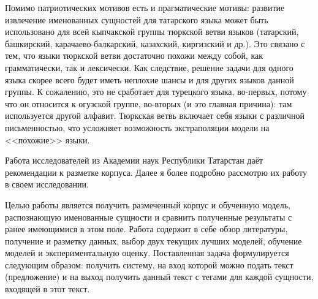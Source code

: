 Помимо патриотических мотивов есть и прагматические мотивы: развитие извлечение именованных сущностей для татарского языка может быть использовано для всей кыпчакской группы тюркской ветви языков (татарский, башкирский, карачаево-балкарский, казахский, киргизский и др.). Это связано с тем, что языки тюркской ветви достаточно похожи между собой, как грамматически, так и лексически. Как следствие, решение задачи для одного языка скорее всего будет иметь неплохие шансы и для других языков данной группы. К сожалению, это не сработает для турецкого языка, во-первых, потому что он относится к огузской группе, во-вторых (и это главная причина): там используется другой алфавит. Тюркская ветвь включает себя языки с различной письменностью, что усложняет возможность экстраполяции модели на <<похожие>> языки. %

Работа \cite{Nevzorova} исследователей из Академии наук Республики Татарстан даёт рекомендации к разметке корпуса. Далее я более подробно рассмотрю их работу в своем исследовании.

Целью работы является получить размеченный корпус и обученную модель, распознающую именованные сущности и сравнить полученные результаты с ранее имеющимися в этом поле. Работа содержит в себе обзор литературы, получение и разметку данных, выбор двух текущих лучших моделей, обучение моделей и экспериментальную оценку. Поставленная задача формулируется следующим образом: получить систему, на вход которой можно подать текст (предложение) и на выход получить данный текст с тегами для каждой сущности, входящей в этот текст.












